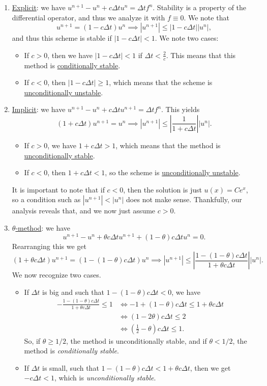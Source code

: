 \documentclass{article}
\begin{document}
\begin{enumerate}
    \item \underline{Explicit}: we have $u^{n+1}-u^n + c\Delta t u^n = \Delta t f^n$. Stability is a property of the differential operator, and thus we analyze it with $f\equiv 0$. We note that
    $$u^{n+1} = (1-c\Delta t)u^n \implies |u^{n+1}|\leq |1-c\Delta t||u^n|,$$
    and thus this scheme is stable if $|1-c\Delta t|< 1$. We note two cases:
    \begin{itemize}
        \item If $c > 0$, then we have $|1-c\Delta t|<1$ if $\Delta t < \frac{2}{c}$. This means that this method is \underline{conditionally stable}. 
        \item If $c< 0$, then $|1-c\Delta t|\geq 1$, which means that the scheme is \underline{unconditionally unstable}.
    \end{itemize} 
    \item \underline{Implicit}: we have $u^{n+1}-u^n + c\Delta tu^{n+1} = \Delta t f^n$. This yields
    $$(1+c\Delta t) u^{n+1} = u^n \implies |u^{n+1}| \leq \left|\frac{1}{1+c\Delta t}\right| |u^{n}|.$$
    \begin{itemize}
        \item If $c > 0$,  we have $1+c\Delta t >1$, which means that the method is \underline{unconditionally stable}. 
        \item If $c < 0$, then $1+c\Delta t <1$, so the scheme is \underline{unconditionally unstable}.
    \end{itemize}     
    It is important to note that if $c<0$, then the solution is just $u(x) = Ce^x$, so a condition such as $|u^{n+1}|<|u^n|$ does not make sense. Thankfully, our analysis reveals that, and we now just assume $c>0$. 
    \item \underline{$\theta$-method}: we have
    $$
    u^{n+1}-u^n + \theta c\Delta t u^{n+1} + (1-\theta)c\Delta t u^n = 0.
    $$
    Rearranging this we get
    $$
    (1+\theta c\Delta t)u^{n+1} = (1- (1-\theta)c\Delta t) u^n \implies |u^{n+1}| \leq \left|\frac{1-(1-\theta)c\Delta t}{1+\theta c\Delta t}\right| |u^n|.
    $$
    We now recognize two cases. 
    \begin{itemize}
        \item If $\Delta t$ is big and such that $1-(1-\theta)c\Delta t < 0$, we have
        \begin{align*}
            -\frac{1-(1-\theta)c\Delta t}{1+\theta c\Delta t} \leq 1 &\iff -1+(1-\theta)c\Delta t \leq 1+\theta c\Delta t\\
            &\iff (1-2\theta) c\Delta t \leq 2\\
            &\iff \left(\frac{1}{2}-\theta\right)c\Delta t\leq 1.
        \end{align*}
        So, if $\theta\geq 1/2$, the method is unconditionally stable, and if $\theta <1/2$, the method is \emph{conditionally stable}. 
        \item If $\Delta t$ is small, such that $1-(1-\theta)c\Delta t < 1 + \theta c \Delta t$, then we get $-c\Delta t < 1$, which is \emph{unconditionally stable}. 
    \end{itemize}
\end{enumerate}
\end{document}
